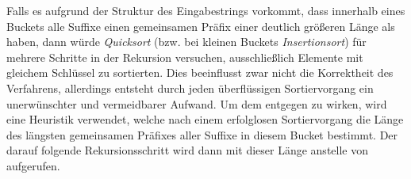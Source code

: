 Falls es aufgrund der Struktur des Eingabestrings vorkommt, dass innerhalb eines Buckets alle Suffixe einen gemeinsamen Präfix einer deutlich größeren Länge als \offset haben, dann würde \emph{Quicksort} (bzw. bei kleinen Buckets \emph{Insertionsort}) für mehrere Schritte in der Rekursion versuchen, ausschließlich Elemente mit gleichem Schlüssel zu sortierten. Dies beeinflusst zwar nicht die Korrektheit des Verfahrens, allerdings entsteht durch jeden überflüssigen Sortiervorgang ein unerwünschter und vermeidbarer Aufwand. Um dem entgegen zu wirken, wird eine Heuristik verwendet, welche nach einem \glqq erfolglosen\grqq{} Sortiervorgang die Länge des längsten gemeinsamen Präfixes aller Suffixe in diesem Bucket bestimmt. Der darauf folgende Rekursionsschritt wird dann mit dieser Länge anstelle von \offset aufgerufen.
